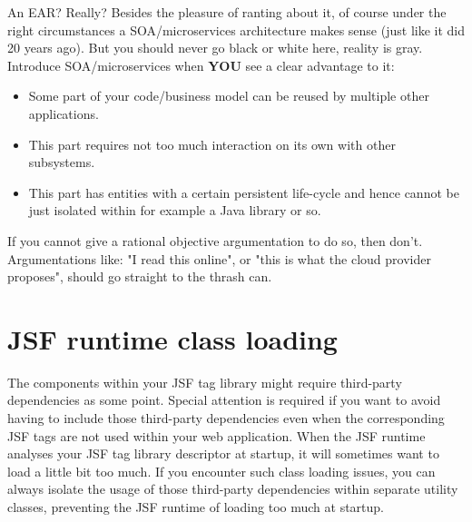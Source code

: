 \begin{ClownComputing}{An EAR? Really?}
Besides the pleasure of ranting about it,
of course under the right circumstances a SOA/microservices architecture makes sense (just like it did 20 years ago).
But you should never go black or white here, reality is gray.
Introduce SOA/microservices when \textbf{YOU} see a clear advantage to it:
\begin{itemize}
	\item Some part of your code/business model can be reused by multiple other applications.
	\item This part requires not too much interaction on its own with other subsystems.
	\item This part has entities with a certain persistent life-cycle and hence cannot be just isolated within for example a Java library or so.
\end{itemize}
If you cannot give a rational objective argumentation to do so,
then don't.
Argumentations like: "I read this online", or "this is what the cloud provider proposes", should go straight to the thrash can.
\end{ClownComputing}

\section{JSF runtime class loading}
The components within your JSF tag library might require third-party dependencies as some point.
Special attention is required if you want to avoid having to include those third-party dependencies even when the corresponding JSF tags are not used within your web application.
When the JSF runtime analyses your JSF tag library descriptor at startup, it will sometimes want to load a little bit too much.
If you encounter such class loading issues, you can always isolate the usage of those third-party dependencies within separate utility classes, preventing the JSF runtime of loading too much at startup.